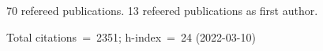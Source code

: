 70 refereed publications. 13 refeered publications as first author.

Total citations~=~2351; h-index~=~24 (2022-03-10)